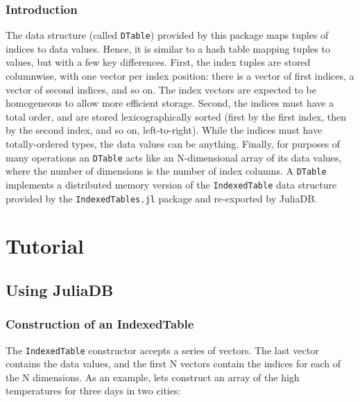 \documentclass{memoir}
\begin{document}
\hypertarget{11016140136578384351}{}


\section{Introduction}



The data structure (called \texttt{DTable}) provided by this package maps tuples of indices to data values.   Hence, it is similar to a hash table mapping tuples to values, but with a few key differences. First, the index tuples are stored columnwise, with one vector per index position: there is a vector of first indices, a vector of second indices, and so on. The index vectors are expected to be homogeneous to allow more efficient storage. Second, the indices must have a total order, and are stored lexicographically sorted (first by the first index, then by the second index, and so on, left-to-right). While the indices must have totally-ordered types, the data values can be anything. Finally, for purposes of many operations an \texttt{DTable} acts like an N-dimensional array of its data values, where the number of dimensions is the number of index columns.  A \texttt{DTable} implements a distributed memory version of the \texttt{IndexedTable} data structure provided by the \texttt{IndexedTables.jl} package and re-exported by JuliaDB.



\part{Tutorial}




\hypertarget{17352761750160139593}{}


\chapter{Using JuliaDB}



\hypertarget{3131906217985619023}{}


\section{Construction of an IndexedTable}



The \texttt{IndexedTable} constructor accepts a series of vectors. The last vector contains the data values, and the first N vectors contain the indices for each of the N dimensions. As an example, let{\textquotesingle}s construct an array of the high temperatures for three days in two cities:
\end{document}
